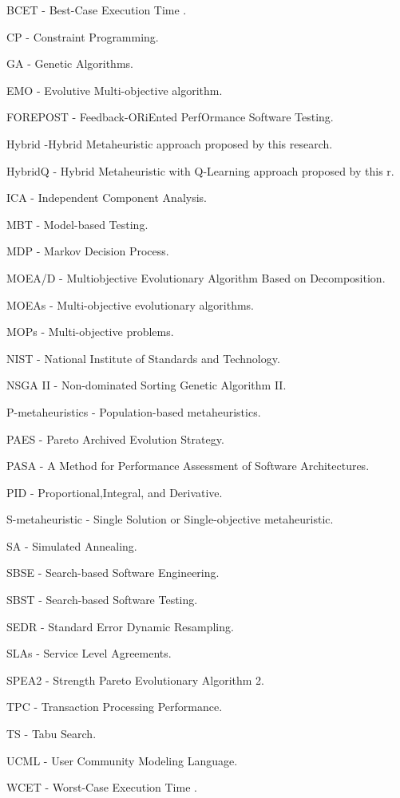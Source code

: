 
\begin{description}
 \item BCET - Best-Case Execution Time .
 \item CP - Constraint Programming.
 \item GA - Genetic Algorithms.
 \item EMO - Evolutive Multi-objective algorithm.
 \item FOREPOST - Feedback-ORiEnted PerfOrmance Software Testing.
 \item Hybrid -Hybrid Metaheuristic approach proposed by this research.
 \item HybridQ - Hybrid Metaheuristic with Q-Learning approach proposed by this r.
 \item ICA - Independent Component Analysis.
 \item MBT - Model-based Testing.
 \item MDP - Markov Decision Process.
 \item MOEA/D - Multiobjective Evolutionary Algorithm Based on Decomposition.
 \item MOEAs - Multi-objective evolutionary algorithms. 
 \item MOPs - Multi-objective problems. 
 \item NIST -  National Institute of Standards and Technology. 
 \item NSGA II - Non-dominated Sorting Genetic Algorithm II.
 \item P-metaheuristics - Population-based metaheuristics.
 \item PAES - Pareto Archived Evolution Strategy.
 \item PASA - A Method for Performance Assessment of Software Architectures.
 \item PID - Proportional,Integral, and Derivative.
 \item S-metaheuristic - Single Solution or Single-objective metaheuristic.
 \item SA - Simulated Annealing.
 \item SBSE - Search-based Software Engineering.
 \item SBST - Search-based Software Testing. 
 \item SEDR - Standard Error Dynamic Resampling.
 \item SLAs - Service Level Agreements.
 \item SPEA2 - Strength Pareto Evolutionary Algorithm 2.
 \item TPC - Transaction Processing Performance.
 \item TS - Tabu Search.
 \item UCML -  User Community Modeling Language.
 \item WCET - Worst-Case Execution Time .

 
\end{description}
